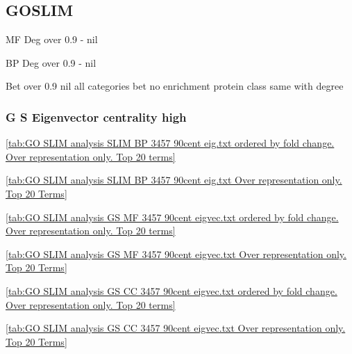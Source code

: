 \subsection{GOSLIM}

MF Deg over 0.9 - nil

BP Deg over 0.9 - nil




Bet over 0.9 nil all categories
bet no enrichment protein class same with degree

\subsubsection{G S Eigenvector centrality high}


\ref{tab:GO SLIM analysis SLIM BP 3457 90cent eig.txt ordered by fold change. Over representation only. Top 20 terms}

\ref{tab:GO SLIM analysis SLIM BP 3457 90cent eig.txt Over representation only. Top 20 Terms}

\ref{tab:GO SLIM analysis GS MF 3457 90cent eigvec.txt ordered by fold change. Over representation only. Top 20 terms}

\ref{tab:GO SLIM analysis GS MF 3457 90cent eigvec.txt Over representation only. Top 20 Terms}

\ref{tab:GO SLIM analysis GS CC 3457 90cent eigvec.txt ordered by fold change. Over representation only. Top 20 terms}

\ref{tab:GO SLIM analysis GS CC 3457 90cent eigvec.txt Over representation only. Top 20 Terms}

